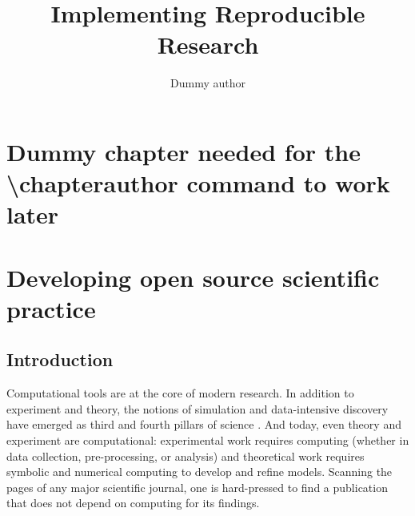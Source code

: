 \documentclass[ChapterTOCs,krantz2]{krantz} %
\begin{document}
\title{Implementing Reproducible Research}
\author{Dummy author}
\chapter*{Dummy chapter needed for the \textbackslash chapterauthor command to work later}

\mainmatter


\chapter{Developing open source scientific practice}

%

\section{Introduction}\label{intro}

Computational tools are at the core of modern research. In addition to
experiment and theory, the notions of simulation and data-intensive discovery
have emerged as third and fourth pillars of science \cite{4th-paradigm}.  And
today, even theory and experiment are computational: experimental work requires
computing (whether in data collection, pre-processing, or analysis) and
theoretical work requires symbolic and numerical computing to develop and
refine models. Scanning the pages of any major scientific journal, one is
hard-pressed to find a publication that does not depend on
computing for its findings.
\end{document}
